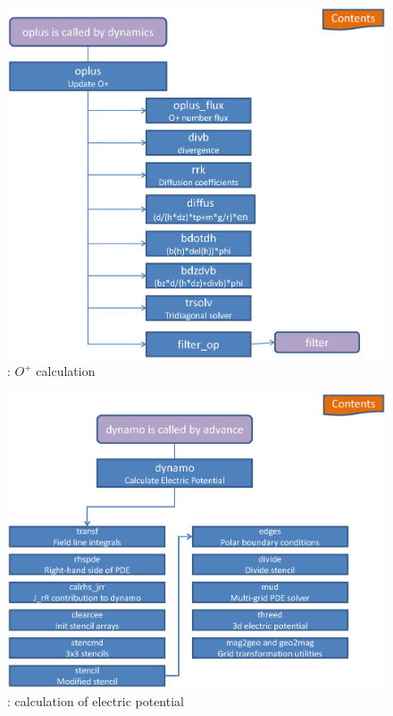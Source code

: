 \begin{figure}
  \centering
  \includegraphics[scale=0.7,angle=-90.]{./tex_plot/code_7.ps}
  \caption{: $O^+$ calculation}
   \label{fig:code_7}
\end{figure}
%
\begin{figure}
  \centering
  \includegraphics[scale=0.7,angle=-90.]{./tex_plot/code_8.ps}
  \caption{: calculation of electric potential}
   \label{fig:code_8}
\end{figure}
